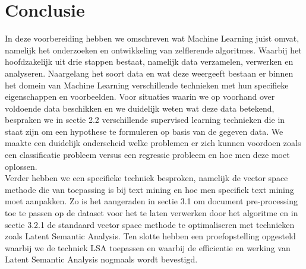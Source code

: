 \chapter{Conclusie}\label{Conclusie}

In deze voorbereiding hebben we omschreven wat Machine Learning juist omvat, namelijk het onderzoeken en ontwikkeling van zelflerende algoritmes. Waarbij het hoofdzakelijk uit drie stappen bestaat, namelijk data verzamelen, verwerken en analyseren. Naargelang het soort data en wat deze weergeeft bestaan er binnen het domein van Machine Learning verschillende technieken met hun specifieke eigenschappen en voorbeelden.  Voor situaties waarin we op voorhand over voldoende data beschikken en we duidelijk weten wat deze data betekend, bespraken we in sectie 2.2 verschillende supervised learning technieken die in staat zijn om een hypothese te formuleren op basis van de gegeven data. We maakte een duidelijk onderscheid welke problemen er zich kunnen voordoen zoals een classificatie probleem versus een regressie probleem en hoe men deze moet oplossen.\\
Verder hebben we een specifieke techniek besproken, namelijk de vector space methode die van toepassing is bij text mining en hoe men specifiek text mining moet aanpakken. Zo is het aangeraden  in sectie 3.1 om document pre-processing toe te passen op de dataset voor het te laten verwerken door het algoritme en in sectie 3.2.1 de standaard vector space methode te optimaliseren met technieken zoals Latent Semantic Analysis. Ten slotte hebben een proefopstelling opgesteld waarbij we de techniek LSA toepassen en  waarbij de efficientie en werking van Latent Semantic Analysis nogmaals wordt bevestigd.

